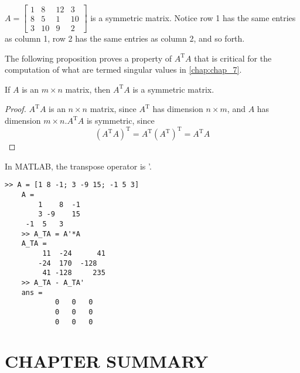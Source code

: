 \documentclass[../main.tex]{subfiles}
\begin{document}
\begin{example}
 $ A =
\begin{bmatrix}
	1 & 8 & 12 & 3\\
	8 & 5 &  1 & 10\\
	3 & 10 & 9 & 2
\end{bmatrix}$
is a symmetric matrix. Notice row 1 has the same entries as column 1, row 2 has the same entries as column 2, and so forth.
\end{example}

The following proposition proves a property of $A^{\mathrm{T}} A$ that is critical for the computation of what are termed singular values in \autoref{chap:chap_7}.

\begin{proposition}
	If $A$ is an $m \times n$ matrix, then $A^{\mathrm{T}} A$ is a symmetric matrix.
\end{proposition}

\begin{proof}
	$A^{\mathrm{T}} A$ is an $n \times n$ matrix, since $A^{\mathrm{T}}$ has dimension $n \times m$, and $A$ has dimension $m \times n . A^{\mathrm{T}} A$ is symmetric, since
	$$\left(A^{\mathrm{T}} A\right)^{\mathrm{T}}=A^{\mathrm{T}}\left(A^{\mathrm{T}}\right)^{\mathrm{T}}=A^{\mathrm{T}} A$$
\end{proof}
\begin{example} In MATLAB, the transpose operator is '.

\begin{lstlisting}[numbers=none,frame=none]
	>> A = [1 8 -1; 3 -9 15; -1 5 3]
	A =
		1	 8	-1
		3 -9	15
	 -1	 5	 3
	>> A_TA = A'*A
	A_TA =
		 11	 -24	  41
		-24	 170  -128
		 41	-128	 235
	>> A_TA - A_TA'
	ans =
			0	0	0
			0	0	0
			0	0	0
\end{lstlisting}
\end{example}

\section[Chapter Summary]{CHAPTER SUMMARY}
\end{document}
